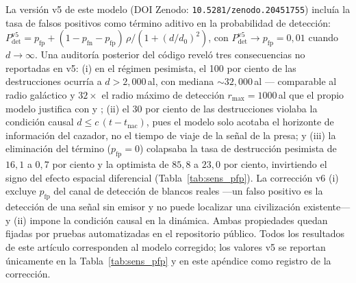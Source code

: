 \documentclass[useAMS,usenatbib,onecolumn]{mn2e}
\begin{document}
La versión v5 de este modelo (DOI Zenodo:
\texttt{10.5281/zenodo.20451755}) incluía la tasa de falsos positivos
como término aditivo en la probabilidad de detección:
$P_\text{det}^\text{v5} = p_\text{fp} + (1 - p_\text{fn} -
p_\text{fp})\,\rho/(1 + (d/d_0)^2)$, con
$P_\text{det}^\text{v5} \to p_\text{fp} = 0{,}01$ cuando
$d \to \infty$.
Una auditoría posterior del código reveló tres consecuencias no
reportadas en v5:
(i) en el régimen pesimista, el 100 por ciento de las destrucciones
ocurría a $d > 2{,}000$\,al, con mediana $\sim 32{,}000$\,al —
comparable al radio galáctico y $32\times$ el radio máximo de
detección $r_\text{max} = 1000$\,al que el propio modelo justifica con
\citet{troitskij1989} y \citet{loeb2007};
(ii) el 30 por ciento de las destrucciones violaba la condición causal
$d \leq c\,(t - t_\text{nac})$, pues el modelo solo acotaba el
horizonte de información del cazador, no el tiempo de viaje de la
señal de la presa; y
(iii) la eliminación del término ($p_\text{fp} = 0$) colapsaba la tasa
de destrucción pesimista de $16{,}1$ a $0{,}7$ por ciento y la
optimista de $85{,}8$ a $23{,}0$ por ciento, invirtiendo el signo del
efecto espacial diferencial (Tabla~\ref{tab:sens_pfp}).
La corrección v6 (i) excluye $p_\text{fp}$ del canal de detección de
blancos reales —un falso positivo es la detección de una señal sin
emisor y no puede localizar una civilización existente— y (ii) impone
la condición causal en la dinámica.
Ambas propiedades quedan fijadas por pruebas automatizadas en el
repositorio público.
Todos los resultados de este artículo corresponden al modelo
corregido; los valores v5 se reportan únicamente en la
Tabla~\ref{tab:sens_pfp} y en este apéndice como registro de la
corrección.
\end{document}
